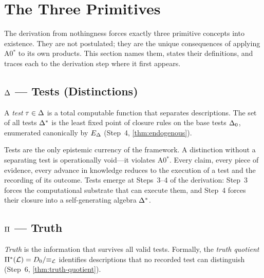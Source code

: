 
\section{The Three Primitives}
\label{sec:primitives}

The derivation from nothingness forces exactly three primitive concepts into
existence.  They are not postulated; they are the unique consequences of
applying A0$^*$ to its own products.  This section names them, states their
definitions, and traces each to the derivation step where it first appears.

\subsection{$\Delta$ --- Tests (Distinctions)}
\label{sec:primitives:delta}

\begin{definition}[Tests]
\label{def:prim-delta}
A \emph{test} $\tau \in \Delta$ is a total computable function that separates
descriptions.  The set of all tests $\Delta^*$ is the least fixed point of
closure rules on the base tests $\Delta_0$, enumerated canonically by
$E_\Delta$ (Step~4, \cref{thm:endogenous}).
\end{definition}

Tests are the only epistemic currency of the framework.  A distinction
without a separating test is operationally void---it violates A0$^*$.
Every claim, every piece of evidence, every advance in knowledge reduces to
the execution of a test and the recording of its outcome.  Tests emerge at
Steps~3--4 of the derivation: Step~3 forces the computational substrate
that can execute them, and Step~4 forces their closure into a self-generating
algebra $\Delta^*$.

\subsection{$\Pi$ --- Truth}
\label{sec:primitives:pi}

\begin{definition}[Truth]
\label{def:prim-pi}
\emph{Truth} is the information that survives all valid tests.  Formally,
the \emph{truth quotient} $\Pi^*(\mathcal{L}) = D_0 / {\equiv_{\mathcal{L}}}$ identifies
descriptions that no recorded test can distinguish (Step~6,
\cref{thm:truth-quotient}).
\end{definition}

